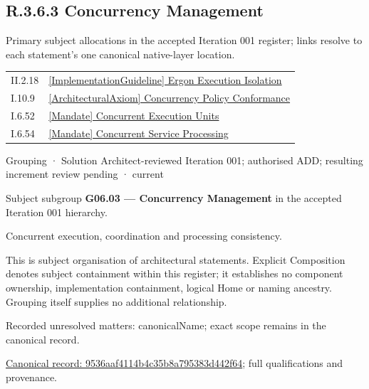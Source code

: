 \subsection*{R.3.6.3 Concurrency Management}
\label{navigation:R.3.6.3}

Primary subject allocations in the accepted Iteration 001 register; links resolve to each statement’s one canonical native-layer location.\par
\begin{longtable}{p{.22\linewidth}p{.73\linewidth}}
II.2.18 & \hyperref[element:4332542fe3c54af9ba07220d255de9c2]{[ImplementationGuideline] Ergon Execution Isolation} \\
I.10.9 & \hyperref[element:7e3b05a2e3e547cbbd26b1e181af0d10]{[ArchitecturalAxiom] Concurrency Policy Conformance} \\
I.6.52 & \hyperref[element:12466ce2701146c1b52a9c68c2fb426c]{[Mandate] Concurrent Execution Units} \\
I.6.54 & \hyperref[element:338a4cb1c2444ec2aa7703fcd9f28247]{[Mandate] Concurrent Service Processing} \\
\end{longtable}
\label{element:9536aaf4114b4c35b8a795383d442f64}
{\small Grouping · Solution Architect-reviewed Iteration 001; authorised ADD; resulting increment review pending · current}\par

Subject subgroup \textbf{G06.03 — Concurrency Management} in the accepted Iteration 001 hierarchy.



Concurrent execution, coordination and processing consistency.



This is subject organisation of architectural statements. Explicit Composition denotes subject containment within this register; it establishes no component ownership, implementation containment, logical Home or naming ancestry. Grouping itself supplies no additional relationship.


{\small Recorded unresolved matters: canonicalName; exact scope remains in the canonical record.}\par
{\footnotesize \href{../../../../continuum/grouping/9536aaf4114b4c35b8a795383d442f64.md}{Canonical record: 9536aaf4114b4c35b8a795383d442f64}; full qualifications and provenance.}\par
